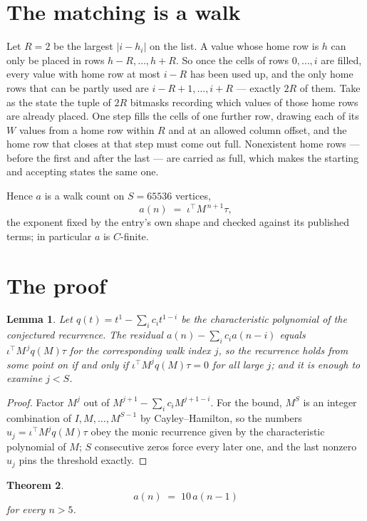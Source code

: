 \documentclass[11pt,a4paper]{article}
\theoremstyle{plain}
\newtheorem{theorem}{Theorem}
\newtheorem{lemma}[theorem]{Lemma}
\theoremstyle{definition}
\begin{document}
\section{The matching is a walk}

Let $R=2$ be the largest $|i-h_i|$ on the list. A value whose home row is $h$ can only be
placed in rows $h-R,\dots,h+R$. So once the cells of rows $0,\dots,i$ are filled, every
value with home row at most $i-R$ has been used up, and the only home rows that can be
partly used are $i-R+1,\dots,i+R$ --- exactly $2R$ of them. Take as the state the tuple of
$2R$ bitmasks recording which values of those home rows are already placed. One step fills
the cells of one further row, drawing each of its $W$ values from a home row within $R$
and at an allowed column offset, and the home row that closes at that step must come out
full. Nonexistent home rows --- before the first and after the last --- are carried as
full, which makes the starting and accepting states the same one.

Hence $a$ is a walk count on $S=65536$ vertices,
\[
a(n)\;=\;\iota^{\!\top}M^{\,n+1}\tau ,
\]
the exponent fixed by the entry's own shape and checked against its published terms; in
particular $a$ is $C$-finite.

\section{The proof}

\begin{lemma}\label{lem:crit}
Let $q(t)=t^{1}-\sum_i c_it^{1-i}$ be the characteristic polynomial of the
conjectured recurrence. The residual $a(n)-\sum_ic_ia(n-i)$ equals
$\iota^{\!\top}M^{\,j}q(M)\tau$ for the corresponding walk index $j$, so the recurrence
holds from some point on if and only if $\iota^{\!\top}M^{j}q(M)\tau=0$ for all large $j$;
and it is enough to examine $j<S$.
\end{lemma}

\begin{proof}
Factor $M^{j}$ out of $M^{j+1}-\sum_ic_iM^{j+1-i}$. For the bound, $M^{S}$
is an integer combination of $I,M,\dots,M^{S-1}$ by Cayley--Hamilton, so the numbers
$u_j=\iota^{\!\top}M^{j}q(M)\tau$ obey the monic recurrence given by the characteristic
polynomial of $M$; $S$ consecutive zeros force every later one, and the last nonzero $u_j$
pins the threshold exactly.
\end{proof}

\begin{theorem}
\[
a(n)\;=\;10\,a(n-1)
\]
for every $n>5$.
\end{theorem}
\end{document}
